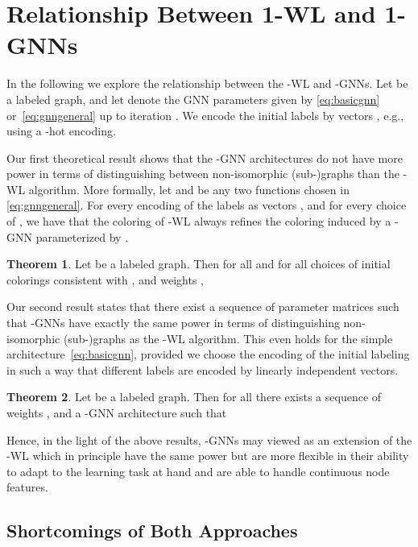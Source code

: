 \documentclass[letterpaper]{article}
\theoremstyle{definition}
\newtheorem{theorem}{Theorem}
\begin{document}
\section{Relationship Between 1-WL and 1-GNNs}

In the following we explore the relationship between the -WL and -GNNs. 
Let  be a labeled graph, and let  denote the GNN parameters given by \cref{eq:basicgnn} or~\cref{eq:gnngeneral} up to iteration . 
We encode the initial labels  by vectors  , e.g., using a -hot encoding. 

Our first theoretical result shows that the -GNN architectures do not have more power in terms of distinguishing between non-isomorphic (sub-)graphs than the -WL algorithm.
More formally, let  and  be any two functions chosen in \eqref{eq:gnngeneral}.
For every encoding of the labels  as vectors , and for every choice of , we have that the coloring  of -WL always refines the coloring  induced by a -GNN parameterized by .

\begin{theorem}\label{thm:refine}
	Let  be a labeled graph. Then for all  and for all choices of initial colorings  consistent with , and weights ,
	
\end{theorem}

Our second result states that there exist a sequence of parameter matrices  such that -GNNs have exactly the same power in terms of distinguishing non-isomorphic \mbox{(sub-)}graphs as the -WL algorithm.
This even holds for the simple architecture~\eqref{eq:basicgnn}, provided we choose the encoding of the initial labeling  in such a way that different labels are encoded by linearly independent vectors.

\begin{theorem}\label{equal}
	Let  be a labeled graph. Then for all \mbox{} there exists a sequence of weights , and a -GNN architecture such that 
	
\end{theorem}

Hence, in the light of the above results, -GNNs may viewed as an extension of the -WL which in principle have the same power but are more flexible in their ability to adapt to the learning task at hand and are able to handle continuous node features.

\subsection{Shortcomings of Both Approaches}
\end{document}
